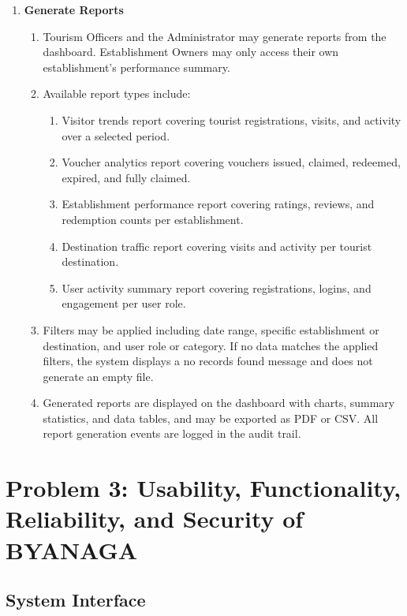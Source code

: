 \documentclass{research}
\begin{document}
\begin{enumerate}
    \item \textbf{Generate Reports}
    \begin{enumerate}
        \item Tourism Officers and the Administrator may generate reports 
        from the dashboard. Establishment Owners may only access their own 
        establishment's performance summary.
        \item Available report types include:
        \begin{enumerate}
            \item Visitor trends report covering tourist registrations, 
            visits, and activity over a selected period.
            \item Voucher analytics report covering vouchers issued, 
            claimed, redeemed, expired, and fully claimed.
            \item Establishment performance report covering ratings, 
            reviews, and redemption counts per establishment.
            \item Destination traffic report covering visits and activity 
            per tourist destination.
            \item User activity summary report covering registrations, 
            logins, and engagement per user role.
        \end{enumerate}
        \item Filters may be applied including date range, specific 
        establishment or destination, and user role or category. If no 
        data matches the applied filters, the system displays a no records 
        found message and does not generate an empty file.
        \item Generated reports are displayed on the dashboard with charts, 
        summary statistics, and data tables, and may be exported as PDF or 
        CSV. All report generation events are logged in the audit trail.
    \end{enumerate}
\end{enumerate}


\section{Problem 3: Usability, Functionality, Reliability, and Security of BYANAGA}

\subsection{System Interface}
\end{document}
